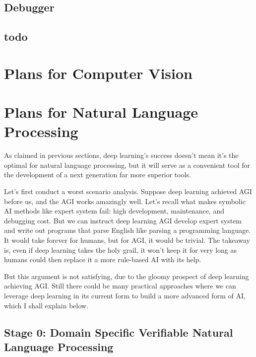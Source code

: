 \documentclass[9pt, oneside]{article}   	%
\theoremstyle{definition}
\begin{document}
\subsection{Debugger}

\subsection{todo}

\section{Plans for Computer Vision}

\section{Plans for Natural Language Processing}

As claimed in previous sections, deep learning's success doesn't mean it's the optimal for natural language processing, but it will serve as a convenient tool for the development of a next generation far more superior tools.

Let's first conduct a worst scenario analysis. Suppose deep learning achieved AGI before us, and the AGI works amazingly well. Let's recall what makes symbolic AI methods like expert system fail: high development, maintenance, and debugging cost. But we can instruct deep learning AGI develop expert system and write out programs that parse English like parsing a programming language. It would take forever for humans, but for AGI, it would be trivial. The takeaway is, even if deep learning takes the holy grail, it won't keep it for very long as humans could then replace it a more rule-based AI with its help.

But this argument is not satisfying, due to the gloomy prospect of deep learning achieving AGI. Still there could be many practical approaches where we can leverage deep learning in its current form to build a more advanced form of AI, which I shall explain below.

\subsection{Stage 0: Domain Specific Verifiable Natural Language Processing}
\end{document}
